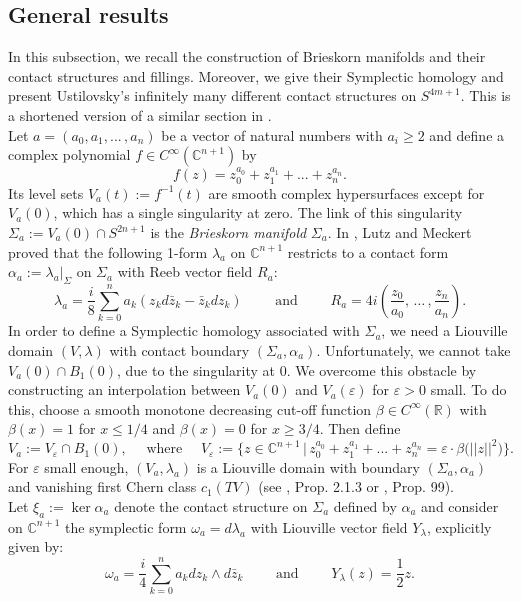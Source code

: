 \documentclass[a4paper,12pt,bibliography=totocnumbered,titlepage=false,abstracton,bookmarksnumbered=true]{scrartcl}
\newcommand{\veps}{\varepsilon}
\theoremstyle{definition}
\begin{document}
\subsection{General results}\label{secGenBrie}
In this subsection, we recall the construction of Brieskorn manifolds and their contact structures and fillings. Moreover, we give their Symplectic homology and present Ustilovsky's infinitely many different contact structures on $S^{4m+1}$. This is a shortened version of a similar section in \cite{Fauck1}.\bigskip\\
Let $a = (a_0,a_1, ...\,, a_n)$ be a vector of natural numbers with $a_i\geq 2$ and define a complex polynomial $f\in C^\infty(\mathbb{C}^{n+1})$ by
\[f(z) = z_0^{a_0}+ z_1^{a_1} + ... + z_n^{a_n}.\]
Its level sets $V_a(t):=f^{-1}(t)$ are smooth complex hypersurfaces except for $V_a(0)$, which has a single singularity at zero. The link of this singularity $\Sigma_a:=V_a(0)\cap S^{2n+1}$ is the \textit{Brieskorn manifold} $\Sigma_a$. In \cite{LuMe}, Lutz and Meckert proved that the following 1-form $\lambda_a$ on $\mathbb{C}^{n+1}$ restricts to a contact form $\alpha_a:=\lambda_a|_\Sigma$ on $\Sigma_a$ with Reeb vector field $R_a$:
  \[\lambda_a =\frac{i}{8} \sum^n_{k=0} a_k (z_kd\bar{z}_k - \bar{z}_kdz_k)\qquad\text{ and }\qquad R_a = 4i\left( \frac{z_0}{a_0},\,\dots\,,\frac{z_n}{a_n}\right).\]
In order to define a Symplectic homology associated with $\Sigma_a$, we need a Liouville domain $(V,\lambda)$ with contact boundary $(\Sigma_a,\alpha_a)$. Unfortunately, we cannot take $V_a(0)\cap B_1(0)$, due to the singularity at 0. We overcome this obstacle by constructing an interpolation between $V_a(0)$ and $V_a(\veps)$ for $\veps>0$ small. To do this, choose a smooth monotone decreasing cut-off function $\beta\in C^\infty (\mathbb{R})$ with $\beta(x)= 1$ for $x\leq 1/4$ and  $\beta(x)=0$ for $x\geq 3/4$. Then define
\[ V_a:=V_\veps\cap B_1(0), \quad\text{ where }\quad V_\veps:=\Big\{z\in \mathbb{C}^{n+1}\,\Big|\, z_0^{a_0}+z_1^{a_1}+...+z_n^{a_n} = \veps\cdot\beta\big(||z||^2\big)\Big\}.\]
For $\veps$ small enough, $(V_a,\lambda_a)$ is a Liouville domain with boundary $(\Sigma_a,\alpha_a)$ and vanishing first Chern class $c_1(TV)$ (see \cite{Fauck1}, Prop. 2.1.3 or \cite{FauckThesis}, Prop. 99).\\
Let $\xi_a:=\ker \alpha_a$ denote the contact structure on $\Sigma_a$ defined by $\alpha_a$ and consider on $\mathbb{C}^{n+1}$ the symplectic form $\omega_a = d\lambda_a$ with Liouville vector field $Y_\lambda$, explicitly given by:
\[\omega_a=\frac{i}{4}\sum^n_{k=0} a_kdz_k\wedge d\bar{z}_k\qquad\text{ and }\qquad Y_\lambda(z)=\frac{1}{2}z.\]
\end{document}

